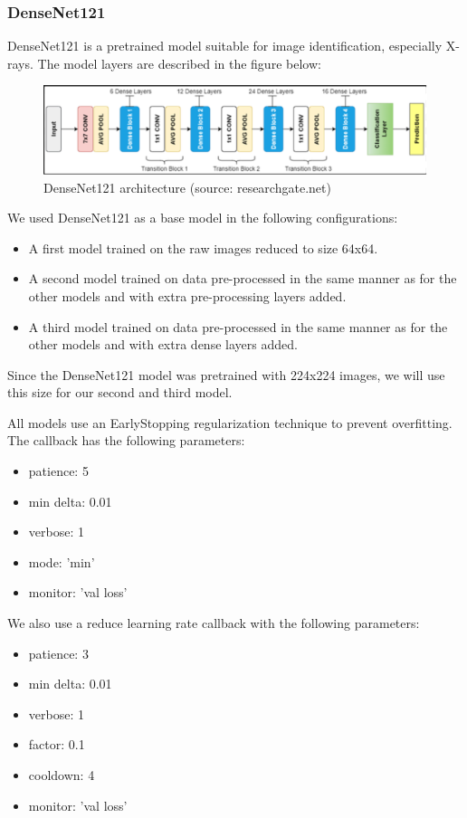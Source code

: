 \documentclass{article}
\begin{document}
\subsubsection{DenseNet121}
DenseNet121 is a pretrained model suitable for image identification, especially X-rays. The model layers are described in the figure below:\\

\begin{figure}[H]
    \centering
    \includegraphics[width=0.8\linewidth]{DN121architecture.png}
    \caption{DenseNet121 architecture (source: researchgate.net)}
    \label{fig:DN121architecture}
\end{figure}

We used DenseNet121 as a base model in the following configurations:
\begin{itemize}
    \item A first model trained on the raw images reduced to size 64x64.
    \item A second model trained on data pre-processed in the same manner as for the other models and with extra pre-processing layers added.
    \item A third model trained on data pre-processed in the same manner as for the other models and with extra dense layers added.
\end{itemize}
 Since the DenseNet121 model was pretrained with 224x224 images, we will use this size for our second and third model.

All models use an EarlyStopping regularization technique to prevent overfitting. The callback has the following parameters:

\begin{itemize}
    \item patience: 5
    \item min delta: 0.01
    \item verbose: 1
    \item mode: 'min'
    \item  monitor: 'val loss'
\end{itemize} 

We also use a reduce learning rate callback with the following parameters:

\begin{itemize}
    \item patience: 3
    \item min delta: 0.01
    \item verbose: 1
    \item factor: 0.1
    \item cooldown: 4
    \item  monitor: 'val loss'
\end{itemize} 
\end{document}
